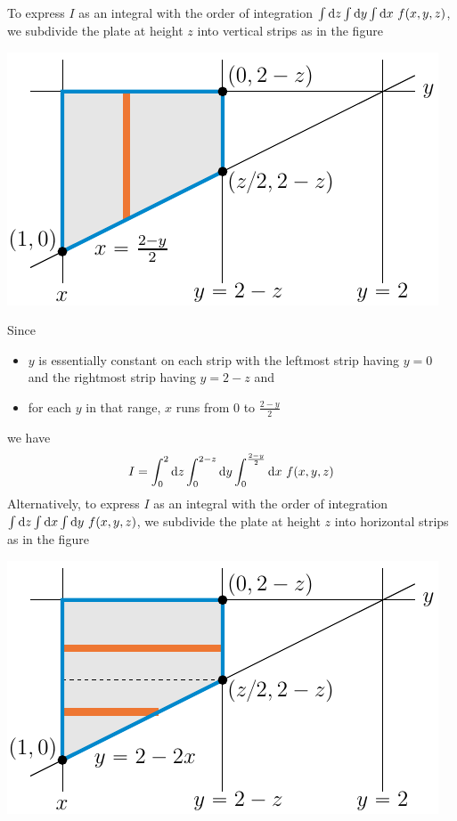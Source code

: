 \begin{eg}
\begin{wfig}
\end{wfig}
To express $I$ as an integral with the order of integration 
$\int\dee{z}\int\dee{y}\int\dee{x}\ f(x,y,z)$, we subdivide the plate at height $z$ into vertical strips as in the figure
\begin{efig}
\begin{center}
    \includegraphics{figs_integration/xchange3v.pdf}
\end{center}
\end{efig}
Since
\begin{itemize} \itemsep1pt \parskip0pt 
\item
$y$ is essentially constant on each strip with the leftmost strip having $y=0$ 
and the rightmost strip having $y=2-z$ and
\item
for each $y$ in that range, $x$ runs from $0$ to $\tfrac{2-y}{2}$
\end{itemize}
we have
\begin{equation*}
I=\int_0^2\dee{z}\int_0^{2-z}\dee{y}\int_0^{\frac{2-y}{2}}\dee{x}\ f(x,y,z)
\end{equation*}
Alternatively, to express $I$ as an integral with the order of integration 
$\int\dee{z}\int\dee{x}\int\dee{y}\ f(x,y,z)$, we subdivide the plate at height $z$ into horizontal strips as in the figure
\begin{efig}
\begin{center}
    \includegraphics{figs_integration/xchange3h.pdf}

\end{center}
\end{efig}
\end{eg}
